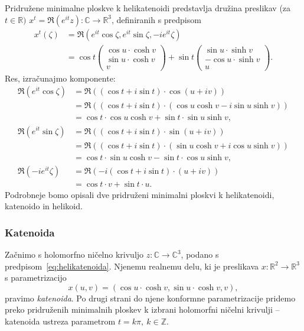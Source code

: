\documentclass[12pt,a4paper,twoside]{article}
\theoremstyle{definition} %
\theoremstyle{plain} %
\numberwithin{equation}{section}  %
\begin{document}
Pridružene minimalne ploskve k helikatenoidi predstavlja družina preslikav (za $t \in \mathbb{R})$ $x^{t} = \Re (e^{it} z) \colon \mathbb{C} \to \mathbb{R}^3$, definiranih s predpisom
%
\begin{align} \label{eq:pridruzene-helikatenoida}
x^{t}(\zeta) &= \Re (e^{it} \cos \zeta, e^{it} \sin \zeta, -i e^{it} \zeta) \nonumber \\
	&= \cos t  
		\begin{pmatrix}
		\cos u \cdot \cosh v \\
		\sin u \cdot \cosh v \\
		v
         	\end{pmatrix}
	+ \sin t
		\begin{pmatrix}
		\sin u \cdot \sinh v \\
		-\cos u \cdot \sinh v \\
		u
         	\end{pmatrix}.
\end{align}
%
Res, izračunajmo komponente:
\begin{align*}
\Re (e^{it} \cos \zeta) &= \Re \left( (\cos t + i\sin t) \cdot \cos(u+iv) \right) \\
	&= \Re \left( (\cos t + i\sin t) \cdot (\cos u \cosh v - i\sin u \sinh v) \right) \\
	&= \cos t \cdot \cos u \cosh v + \sin t \cdot \sin u \sinh v, \\
\Re (e^{it} \sin \zeta) &= \Re \left( (\cos t + i\sin t) \cdot \sin(u+iv) \right) \\
	&= \Re \left( (\cos t + i\sin t) \cdot (\sin u \cosh v + i\cos u \sinh v) \right) \\
	&= \cos t \cdot \sin u \cosh v - \sin t \cdot \cos u \sinh v, \\
\Re (-i e^{it} \zeta) &= \Re \left( -i(\cos t + i\sin t) \cdot (u+iv) \right) \\
	&= \cos t \cdot v + \sin t \cdot u.
\end{align*}
Podrobneje bomo opisali dve pridruženi minimalni ploskvi k helikatenoidi, katenoido in helikoid.

\subsubsection{Katenoida}
%
Začnimo s holomorfno ničelno krivuljo $z \colon \mathbb{C} \to \mathbb{C}^3$, podano s predpisom~\eqref{eq:helikatenoida}. Njenemu realnemu delu, ki je preslikava $x \colon \mathbb{R}^2 \to \mathbb{R}^3$ s parametrizacijo
\begin{equation} \label{eq:katenoida}
x(u,v) = (\cos u \cdot \cosh v, \sin u \cdot \cosh v, v),
\end{equation}
pravimo \emph{katenoida}. Po drugi strani do njene konformne parametrizacije pridemo preko pridruženih minimalnih ploskev k izbrani holomorfni ničelni krivulji -- katenoida ustreza parametrom $t = k \pi, \ k \in \mathbb{Z}$.
\end{document}
